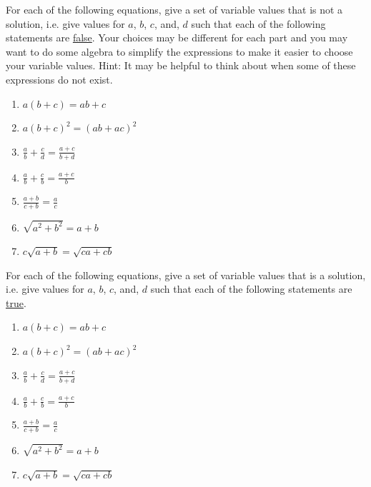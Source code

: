 \bq For each of the following equations, give a set of variable values that is not a solution, i.e. give values for $a$, $b$, $c$, and, $d$ such that each of the following statements are \underline{false}. Your choices may be different for each part and you may want to do some algebra to simplify the expressions to make it easier to choose your variable values. Hint: It may be helpful to think about when some of these expressions do not exist.
\begin{enumerate}
\item $a(b+c)=ab+c$
\item $a(b+c)^2 =(ab+ac)^2$
\item $\frac{a}{b}+\frac{c}{d} =\frac{a+c}{b+d}$
\item $\frac{a}{b}+\frac{c}{b} =\frac{a+c}{b}$
\item $\frac{a+b}{c+b}=\frac{a}{c}$
\item $\sqrt{a^2+b^2}=a+b$
\item $c \sqrt{a+b}=\sqrt{ca+cb}$
\end{enumerate}
\eq
\begin{annotation}
\end{annotation}
\bq For each of the following equations, give a set of variable values that is a solution, i.e. give values for $a$, $b$, $c$, and, $d$ such that each of the following statements are \underline{true}.
\begin{enumerate}
\item $a(b+c)=ab+c$
\item $a(b+c)^2 =(ab+ac)^2$
\item $\frac{a}{b}+\frac{c}{d} =\frac{a+c}{b+d}$
\item $\frac{a}{b}+\frac{c}{b} =\frac{a+c}{b}$
\item $\frac{a+b}{c+b}=\frac{a}{c}$
\item $\sqrt{a^2+b^2}=a+b$
\item $c \sqrt{a+b}=\sqrt{ca+cb}$
\end{enumerate}
\eq

